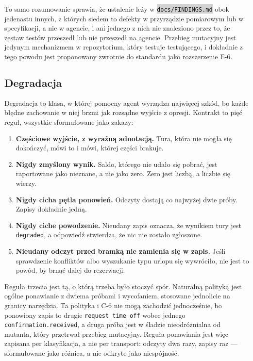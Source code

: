 \documentclass[11pt,a4paper]{article}
\newcommand{\repopath}[1]{\colorbox{lightgray}{\texttt{#1}}}
\begin{document}
To samo rozumowanie sprawia, że ustalenie leży w \repopath{docs/FINDINGS.md} obok jedenastu innych, z których siedem to defekty w przyrządzie pomiarowym lub w specyfikacji, a nie w agencie, i ani jednego z nich nie znaleziono przez to, że zestaw testów przeszedł lub nie przeszedł na agencie. Przebieg mutacyjny jest jedynym mechanizmem w repozytorium, który testuje testującego, i dokładnie z tego powodu jest proponowany zwrotnie do standardu jako rozszerzenie E-6.

\subsection{Degradacja}

Degradacja to klasa, w której pomocny agent wyrządza najwięcej szkód, bo każde błędne zachowanie w niej brzmi jak rozsądne wyjście z opresji. Kontrakt to pięć reguł, wszystkie sformułowane jako zakazy:

\begin{enumerate}[leftmargin=1.6em,itemsep=0.2em]
\item \textbf{Częściowe wyjście, z wyraźną adnotacją.} Tura, która nie mogła się dokończyć, mówi to i mówi, której części brakuje.
\item \textbf{Nigdy zmyślony wynik.} Saldo, którego nie udało się pobrać, jest raportowane jako nieznane, a nie jako zero. Zero jest liczbą, a liczbie się wierzy.
\item \textbf{Nigdy cicha pętla ponowień.} Odczyty dostają co najwyżej dwie próby. Zapisy dokładnie jedną.
\item \textbf{Nigdy ciche powodzenie.} Nieudany zapis oznacza, że wynikiem tury jest \texttt{degraded}, a odpowiedź stwierdza, że nic nie zostało zgłoszone.
\item \textbf{Nieudany odczyt przed bramką nie zamienia się w zapis.} Jeśli sprawdzenie konfliktów albo wyszukanie typu urlopu się wywróciło, nie jest to powód, by brnąć dalej do rezerwacji.
\end{enumerate}

Reguła trzecia jest tą, o którą trzeba było stoczyć spór. Naturalną polityką jest ogólne ponawianie z dwiema próbami i wycofaniem, stosowane jednolicie na granicy narzędzia. Ta polityka i C-6 nie mogą zachodzić jednocześnie, bo ponowiony zapis to drugie \texttt{request\_time\_off} wobec jednego \texttt{confirmation.received}, a druga próba jest w śladzie nieodróżnialna od mutanta, który przetrwał przebieg mutacyjny. Reguła ponawiania jest więc zapisana per klasyfikacja, a nie per transport: odczyty dwa razy, zapisy raz --- sformułowane jako różnica, a nie odkryte jako niespójność.
\end{document}

